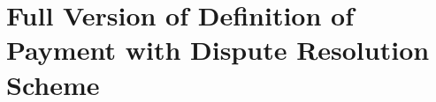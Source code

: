 





\section{Full Version of Definition of Payment with Dispute Resolution Scheme}\label{sec::long-def}





%
%
%
%
%
